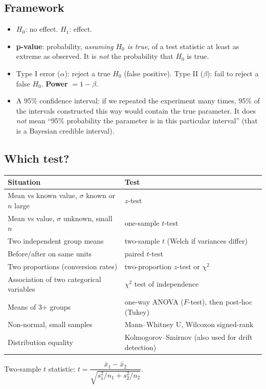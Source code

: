 \subsection{Framework}
\begin{itemize}
  \item $H_0$: no effect. $H_1$: effect.
  \item \textbf{p-value}: probability, \emph{assuming $H_0$ is true}, of a test statistic at least as extreme as observed. It is \emph{not} the probability that $H_0$ is true.
  \item Type I error ($\alpha$): reject a true $H_0$ (false positive). Type II ($\beta$): fail to reject a false $H_0$. \textbf{Power} $=1-\beta$.
  \item A 95\% confidence interval: if we repeated the experiment many times, 95\% of the intervals constructed this way would contain the true parameter. It does \emph{not} mean ``95\% probability the parameter is in this particular interval'' (that is a Bayesian credible interval).
\end{itemize}

\subsection{Which test?}
\begin{tabular}{@{}p{}p{}@{}}
\toprule
Situation & Test\\
\midrule
Mean vs known value, $\sigma$ known or $n$ large & $z$-test\\
Mean vs value, $\sigma$ unknown, small $n$ & one-sample $t$-test\\
Two independent group means & two-sample $t$ (Welch if variances differ)\\
Before/after on same units & paired $t$-test\\
Two proportions (conversion rates) & two-proportion $z$-test or $\chi^2$\\
Association of two categorical variables & $\chi^2$ test of independence\\
Means of 3+ groups & one-way ANOVA ($F$-test), then post-hoc (Tukey)\\
Non-normal, small samples & Mann--Whitney U, Wilcoxon signed-rank\\
Distribution equality & Kolmogorov--Smirnov (also used for drift detection)\\
\bottomrule
\end{tabular}

Two-sample $t$ statistic: $t=\dfrac{\bar x_1-\bar x_2}{\sqrt{s_1^2/n_1+s_2^2/n_2}}$.


